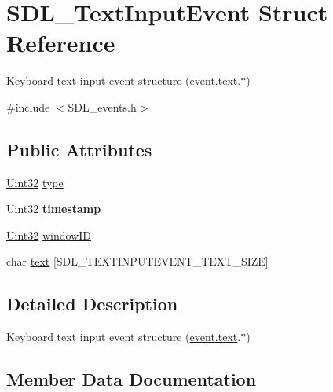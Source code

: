 \hypertarget{structSDL__TextInputEvent}{}\section{S\+D\+L\+\_\+\+Text\+Input\+Event Struct Reference}
\label{structSDL__TextInputEvent}


Keyboard text input event structure (\hyperlink{unionSDL__Event_aa4fc65c559d69f33c057c0c23d8414b8}{event.\+text}.$\ast$)  




{\ttfamily \#include $<$S\+D\+L\+\_\+events.\+h$>$}

\subsection*{Public Attributes}
\begin{DoxyCompactItemize}
\item 
\hyperlink{SDL__stdinc_8h_add440eff171ea5f55cb00c4a9ab8672d}{Uint32} \hyperlink{structSDL__TextInputEvent_a90576be2ea52e694deff40d0586654f5}{type}
\item 
\hypertarget{structSDL__TextInputEvent_a20b190a96494918690ea7f99187be948}{}\hyperlink{SDL__stdinc_8h_add440eff171ea5f55cb00c4a9ab8672d}{Uint32} {\bfseries timestamp}\label{structSDL__TextInputEvent_a20b190a96494918690ea7f99187be948}

\item 
\hyperlink{SDL__stdinc_8h_add440eff171ea5f55cb00c4a9ab8672d}{Uint32} \hyperlink{structSDL__TextInputEvent_aeb4f7a939353990ca40261ffbfbeb3d0}{window\+I\+D}
\item 
char \hyperlink{structSDL__TextInputEvent_a1a95531f466dff01c2f108f53ff24554}{text} \mbox{[}S\+D\+L\+\_\+\+T\+E\+X\+T\+I\+N\+P\+U\+T\+E\+V\+E\+N\+T\+\_\+\+T\+E\+X\+T\+\_\+\+S\+I\+Z\+E\mbox{]}
\end{DoxyCompactItemize}


\subsection{Detailed Description}
Keyboard text input event structure (\hyperlink{unionSDL__Event_aa4fc65c559d69f33c057c0c23d8414b8}{event.\+text}.$\ast$) 

\subsection{Member Data Documentation}
\hypertarget{structSDL__TextInputEvent_a1a95531f466dff01c2f108f53ff24554}{}
